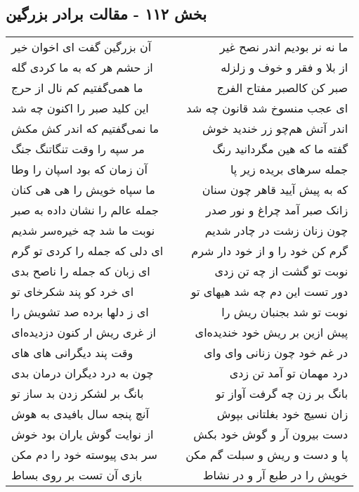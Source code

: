 \begin{center}
\section*{بخش ۱۱۲ - مقالت برادر بزرگین}
\label{sec:sh112}
\begin{longtable}{l p{0.5cm} r}
آن بزرگین گفت ای اخوان خیر
&&
ما نه نر بودیم اندر نصح غیر
\\
از حشم هر که به ما کردی گله
&&
از بلا و فقر و خوف و زلزله
\\
ما همی‌گفتیم کم نال از حرج
&&
صبر کن کالصبر مفتاح الفرج
\\
این کلید صبر را اکنون چه شد
&&
ای عجب منسوخ شد قانون چه شد
\\
ما نمی‌گفتیم که اندر کش مکش
&&
اندر آتش هم‌چو زر خندید خوش
\\
مر سپه را وقت تنگاتنگ جنگ
&&
گفته ما که هین مگردانید رنگ
\\
آن زمان که بود اسپان را وطا
&&
جمله سرهای بریده زیر پا
\\
ما سپاه خویش را هی هی کنان
&&
که به پیش آیید قاهر چون سنان
\\
جمله عالم را نشان داده به صبر
&&
زانک صبر آمد چراغ و نور صدر
\\
نوبت ما شد چه خیره‌سر شدیم
&&
چون زنان زشت در چادر شدیم
\\
ای دلی که جمله را کردی تو گرم
&&
گرم کن خود را و از خود دار شرم
\\
ای زبان که جمله را ناصح بدی
&&
نوبت تو گشت از چه تن زدی
\\
ای خرد کو پند شکرخای تو
&&
دور تست این دم چه شد هیهای تو
\\
ای ز دلها برده صد تشویش را
&&
نوبت تو شد بجنبان ریش را
\\
از غری ریش ار کنون دزدیده‌ای
&&
پیش ازین بر ریش خود خندیده‌ای
\\
وقت پند دیگرانی های های
&&
در غم خود چون زنانی وای وای
\\
چون به درد دیگران درمان بدی
&&
درد مهمان تو آمد تن زدی
\\
بانگ بر لشکر زدن بد ساز تو
&&
بانگ بر زن چه گرفت آواز تو
\\
آنچ پنجه سال بافیدی به هوش
&&
زان نسیج خود بغلتانی بپوش
\\
از نوایت گوش یاران بود خوش
&&
دست بیرون آر و گوش خود بکش
\\
سر بدی پیوسته خود را دم مکن
&&
پا و دست و ریش و سبلت گم مکن
\\
بازی آن تست بر روی بساط
&&
خویش را در طبع آر و در نشاط
\\
\end{longtable}
\end{center}
